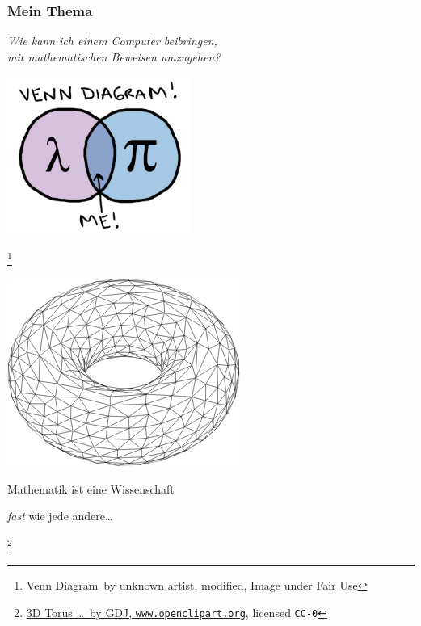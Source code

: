 \documentclass[aspectratio=169]{beamer}
\newcommand\blfootnote[1]{%
  \begingroup
  \renewcommand\thefootnote{}\footnote{#1}%
  \addtocounter{footnote}{-1}%
  \endgroup
}
\begin{document}

\begin{frame}
\frametitle{Mein Thema}

\begin{center}
\emph{Wie kann ich einem Computer beibringen,\\ mit mathematischen Beweisen umzugehen?}
\bigskip\bigskip

\includegraphics[width=0.45\textwidth]{images/venn-diagram.jpg} 
\end{center}

\blfootnote{\glqq Venn Diagram\grqq\ by unknown artist, modified, Image under Fair Use}
\end{frame}


\begin{frame}
 
\vspace{40pt}

\begin{center}
\includegraphics[scale=0.5]{images/torus.png}
\bigskip\bigskip

Mathematik ist eine Wissenschaft

\emph{fast} wie jede andere\dots
\end{center}

\blfootnote{\href{https://openclipart.org/detail/277014/3d-torus-rotated-wireframe-2}{\glqq 3D Torus \dots\grqq\ by GDJ, \texttt{www.openclipart.org}}, licensed \texttt{CC-0}}

\end{frame}
\end{document}
